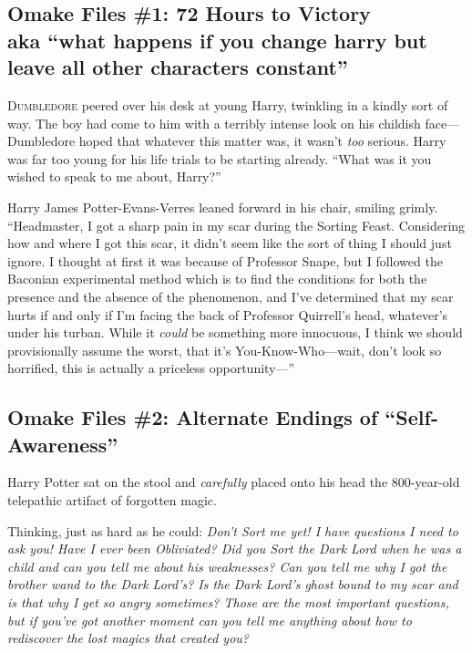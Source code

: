 
\subsection{Omake Files \#1: 72 Hours to Victory\\
\replacement{(}{}\MakeLowercase{AKA “What Happens If You Change Harry But Leave All Other Characters Constant”}\replacement{)}{}}

\lettrine{D}{umbledore} peered over his desk at young Harry, twinkling in a kindly sort of way. The boy had come to him with a terribly intense look on his childish face—Dumbledore hoped that whatever this matter was, it wasn’t \emph{too} serious. Harry was far too young for his life trials to be starting already. “What was it you wished to speak to me about, Harry?”

Harry James Potter-Evans-Verres leaned forward in his chair, smiling grimly. “Headmaster, I got a sharp pain in my scar during the Sorting Feast. Considering how and where I got this scar, it didn’t seem like the sort of thing I should just ignore. I thought at first it was because of Professor Snape, but I followed the Baconian experimental method which is to find the conditions for both the presence and the absence of the phenomenon, and I’ve determined that my scar hurts if and only if I’m facing the back of Professor Quirrell’s head, whatever’s under his turban. While it \emph{could} be something more innocuous, I think we should provisionally assume the worst, that it’s You-Know-Who—wait, don’t look so horrified, this is actually a priceless opportunity—”

\subsection{Omake Files \#2: Alternate Endings of “Self-Awareness”}

\noindent{}Harry Potter sat on the stool and \emph{carefully} placed onto his head the 800-year-old telepathic artifact of forgotten magic.

Thinking, just as hard as he could: \emph{Don’t Sort me yet! I have questions I need to ask you! Have I ever been Obliviated? Did you Sort the Dark Lord when he was a child and can you tell me about his weaknesses? Can you tell me why I got the brother wand to the Dark Lord’s? Is the Dark Lord’s ghost bound to my scar and is that why I get so angry sometimes? Those are the most important questions, but if you’ve got another moment can you tell me anything about how to rediscover the lost magics that created you?}

